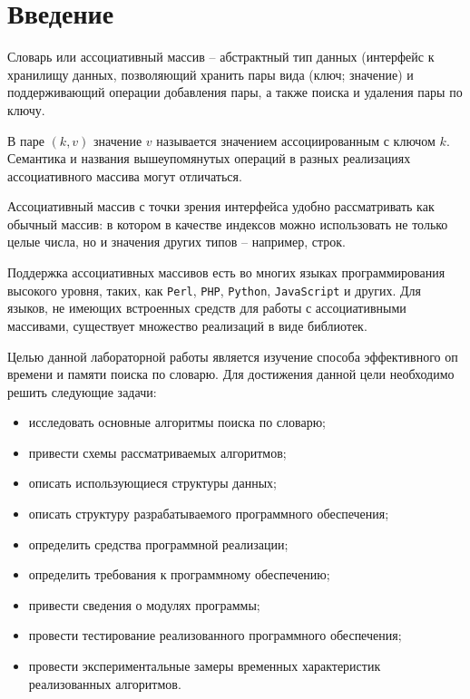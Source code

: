 \chapter*{Введение}

Словарь или ассоциативный массив -- абстрактный тип данных (интерфейс к хранилищу данных, позволяющий хранить пары вида (ключ; значение) и поддерживающий операции добавления пары, а также поиска и удаления пары по ключу.

В паре $(k,v)$ значение $v$ называется значением ассоциированным с ключом $k$. Семантика и названия вышеупомянутых операций в разных реализациях ассоциативного массива могут отличаться.

Ассоциативный массив с точки зрения интерфейса удобно рассматривать как обычный массив: в котором в качестве индексов можно использовать не только целые числа, но и значения других типов -- например, строк.

Поддержка ассоциативных массивов есть во многих языках программирования высокого уровня, таких, как \texttt{Perl}, \texttt{PHP}, \texttt{Python}, \texttt{JavaScript} и других. Для языков, не имеющих встроенных средств для работы с ассоциативными массивами, существует множество реализаций в виде библиотек.

Целью данной лабораторной работы является изучение способа эффективного оп времени и памяти поиска по словарю. Для достижения данной цели необходимо решить следующие задачи:

\begin{itemize}
	\item исследовать основные алгоритмы поиска по словарю;
	\item привести схемы рассматриваемых алгоритмов;
	\item описать использующиеся структуры данных;
	\item описать структуру разрабатываемого программного обеспечения;
	\item определить средства программной реализации;
	\item определить требования к программному обеспечению;
	\item привести сведения о модулях программы;
	\item провести тестирование реализованного программного обеспечения;
	\item провести экспериментальные замеры временных характеристик реализованных алгоритмов.
\end{itemize}
